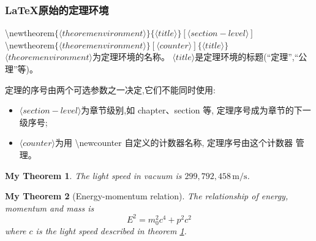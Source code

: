 \documentclass[a4paper]{ctexart}
\begin{document}
    \subsubsection{\LaTeX 原始的定理环境}
    \textbackslash newtheorem$\{\langle theorem environment\rangle\}\{\langle title\rangle\}[\langle section-level\rangle]$\\
    \textbackslash newtheorem$\{\langle theorem environment\rangle\}[\langle counter\rangle]\{\langle title\rangle\}$\\
    $\langle theorem environment\rangle$为定理环境的名称。%
    $\langle title\rangle$是定理环境的标题(``定理'',``公理''等)。\par
    定理的序号由两个可选参数之一决定,它们不能同时使用:
    \renewcommand{\labelitemi}{\textbullet}
    \begin{itemize}
        \item $\langle section-level\rangle$为章节级别,如 chapter、section 等,%
            定理序号成为章节的下一级序号;
        \item $\langle counter\rangle$为用 \textbackslash newcounter 自定义的计数器名称,
            定理序号由这个计数器 管理。
    \end{itemize}
    \newtheorem{mythm}{My Theorem}[subsection]
    \begin{mythm}\label{thm:light}
        The light speed in vacuum%
        is $299,792,458\,\mathrm{m/s}$.
    \end{mythm}
    \begin{mythm}[Energy-momentum relation]
        The relationship of energy, %
        momentum and mass is%
        \[E^2 = m_0^2 c^4 + p^2 c^2\]
        where $c$ is the light speed %
        described in theorem \ref{thm:light}.
    \end{mythm}
\end{document}
